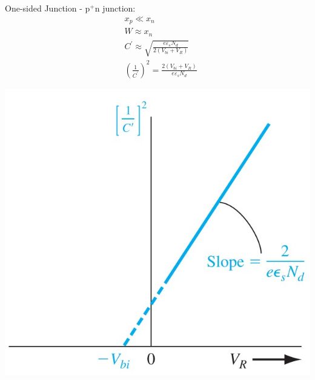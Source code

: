 \documentclass[a4paper, twocolumn]{article}
\begin{document}
    \par One-sided Junction - p$^+$n junction:
    \begin{equation*}
        \begin{aligned}
            & x_{p} \ll x_n \\
            & W \approx x_n \\
            & C^\prime \approx \sqrt{\frac{e \varepsilon_s N_d}{2 (V_{bi} + V_R)} } \\
            & \left( \frac{1}{C^\prime}  \right)^2 = \frac{2(V_{bi} + V_R)}{e \varepsilon_s N_d} 
        \end{aligned}
    \end{equation*}
    \begin{center}
        \includegraphics[width=0.4\linewidth]{C-versus-VR.jpg} \\
    \end{center}
    
\end{document}
